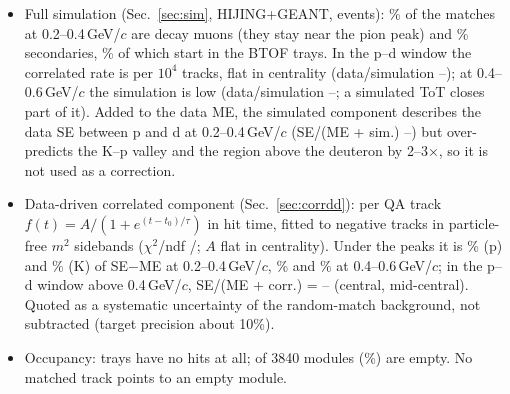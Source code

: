 \begin{itemize}
  yields within \bigTwoYieldAgree\% at 0.4--2\,GeV/$c$. The SE excess between p and d at low momentum is a fixed rate per track, independent of
  centrality and flat in time, so it is not a random match (Sec.~\ref{sec:lowp}).
\item Full simulation (Sec.~\ref{sec:sim}, HIJING+GEANT, \simEvGen{} events): \simFrDecA\% of the matches at 0.2--0.4\,GeV/$c$ are decay
  muons (they stay near the pion peak) and \simFrSecA\% secondaries, \simSecTray\% of which start in the BTOF trays. In the p--d window the
  correlated rate is \simCorrA{} per $10^4$ tracks, flat in centrality (data/simulation \simDataRatMinA--\simDataRatMaxA); at
  0.4--0.6\,GeV/$c$ the simulation is low (data/simulation \simDataRatMinB--\simDataRatMaxB; a simulated ToT closes part of it).
  Added to the data ME, the simulated component describes the data SE between p and d at 0.2--0.4\,GeV/$c$ (SE/(ME + sim.)
  \tmplFastRatSumCiA--\tmplFastRatSumPerA) but over-predicts the K--p valley and the region above the deuteron by 2--3$\times$, so it is
  not used as a correction.
\item Data-driven correlated component (Sec.~\ref{sec:corrdd}): per QA track $f(t)=A/(1+e^{(t-t_0)/\tau})$ in hit time, fitted to
  negative tracks in particle-free $m^2$ sidebands ($\chi^2$/ndf \cddChiN/\cddNdf; $A$ flat in centrality). Under the peaks it is
  \cddpAllA\% (p) and \cddKAllA\% (K) of SE$-$ME at 0.2--0.4\,GeV/$c$, \cddpAllB\% and \cddKAllB\% at 0.4--0.6\,GeV/$c$; in the p--d window
  above 0.4\,GeV/$c$, SE/(ME + corr.) = \cddPdCMMin--\cddPdCMMax{} (central, mid-central). Quoted as a systematic uncertainty of
  the random-match background, not subtracted (target precision about 10\%).
\item Occupancy: trays \deadTrayList{} have no hits at all; \nDeadModule{} of 3840 modules
  (\fracDeadModule\%) are empty. No matched track points to an empty module.
\end{itemize}

